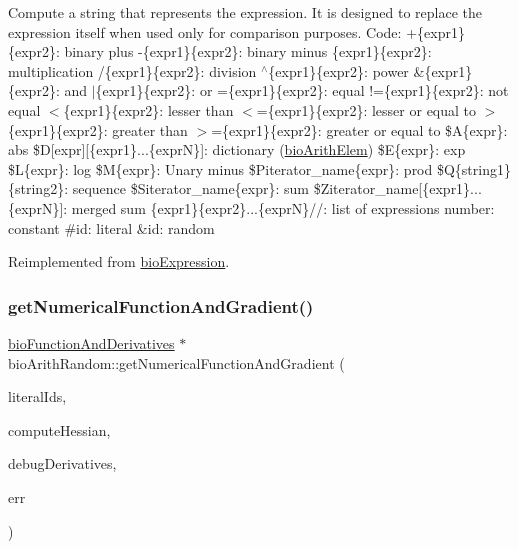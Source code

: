 Compute a string that represents the expression. It is designed to replace the expression itself when used only for comparison purposes. Code\+: +\{expr1\}\{expr2\}\+: binary plus -\/\{expr1\}\{expr2\}\+: binary minus \{expr1\}\{expr2\}\+: multiplication /\{expr1\}\{expr2\}\+: division $^\wedge$\{expr1\}\{expr2\}\+: power \&\{expr1\}\{expr2\}\+: and $\vert$\{expr1\}\{expr2\}\+: or =\{expr1\}\{expr2\}\+: equal !=\{expr1\}\{expr2\}\+: not equal $<$\{expr1\}\{expr2\}\+: lesser than $<$=\{expr1\}\{expr2\}\+: lesser or equal to $>$\{expr1\}\{expr2\}\+: greater than $>$=\{expr1\}\{expr2\}\+: greater or equal to \$A\{expr\}\+: abs \$D\mbox{[}expr\mbox{]}\mbox{[}\{expr1\}...\{exprN\}\mbox{]}\+: dictionary (\hyperlink{classbio_arith_elem}{bio\+Arith\+Elem}) \$E\{expr\}\+: exp \$L\{expr\}\+: log \$M\{expr\}\+: Unary minus \$\+Piterator\+\_\+name\{expr\}\+: prod \$Q\{string1\}\{string2\}\+: sequence \$\+Siterator\+\_\+name\{expr\}\+: sum \$\+Ziterator\+\_\+name\mbox{[}\{expr1\}...\{exprN\}\mbox{]}\+: merged sum \{expr1\}\{expr2\}...\{exprN\}//\+: list of expressions number\+: constant \#id\+: literal \&id\+: random 

Reimplemented from \hyperlink{classbio_expression_a3e4b4dca58dbbc6f0e411b30eb3f60b4}{bio\+Expression}.

\mbox{\label{classbio_arith_random_a6f422273cd162e5d7d5e6d1d7a7ddcad}} 
\subsubsection{\texorpdfstring{get\+Numerical\+Function\+And\+Gradient()}{getNumericalFunctionAndGradient()}}
{\footnotesize\ttfamily \hyperlink{classbio_function_and_derivatives}{bio\+Function\+And\+Derivatives} $\ast$ bio\+Arith\+Random\+::get\+Numerical\+Function\+And\+Gradient (\begin{DoxyParamCaption}\item[{vector$<$ pat\+U\+Long $>$}]{literal\+Ids,  }\item[{pat\+Boolean}]{compute\+Hessian,  }\item[{pat\+Boolean}]{debug\+Derivatives,  }\item[{pat\+Error $\ast$\&}]{err }\end{DoxyParamCaption})\hspace{0.3cm}{\ttfamily [virtual]}}

